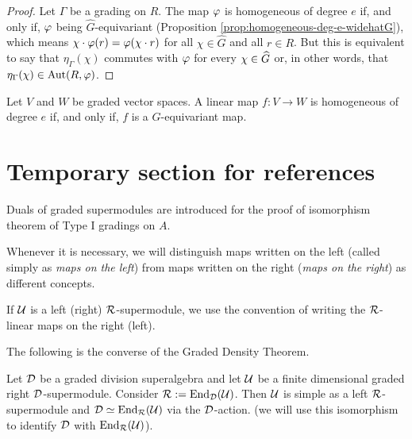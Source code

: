 \begin{proof}
	Let $\Gamma$ be a grading on $R$. The map $\varphi$ is homogeneous of degree $e$ if, and only if, $\varphi$ being $\widehat G$-equivariant (Proposition \ref{prop:homogeneous-deg-e-widehatG}), which means $\chi\cdot \varphi (r) = \varphi (\chi\cdot r)$ for all $\chi \in \widehat G$ and all $r \in R$. But this is equivalent to say that $\eta_\Gamma(\chi)$ commutes with $\varphi$ for every $\chi \in \widehat G$ or, in other words, that $\eta_\Gamma(\chi) \in \operatorname{Aut} (R, \varphi)$.
\end{proof}

\begin{prop}\label{prop:homogeneous-deg-e-widehatG}
	Let $V$ and $W$ be graded vector spaces. A linear map $f: V \to W$ is homogeneous of degree $e$ if, and only if, $f$ is a $\widehat G$-equivariant map.
\end{prop}

\section{Temporary section for references}

Duals of graded supermodules are introduced for the proof of isomorphism theorem of Type I gradings on $A$.

\begin{convention}\label{conv:maps-left-right}
	Whenever it is necessary, we will distinguish maps written on the left (called simply as \emph{maps on the left}) from maps written on the  right (\emph{maps on the right}) as different concepts.

	If $\mathcal U$ is a left (right) $\mathcal R$-supermodule, we use the convention of writing the $\mathcal R$-linear maps on the right (left).
\end{convention}

The following is the converse of the Graded Density Theorem.

\begin{prop}\label{prop:converse-density-thm}
	Let $\mathcal{D}$ be a graded division superalgebra and let $\mathcal U$ be a finite dimensional graded right $\mathcal{D}$-supermodule. Consider $\mathcal R := \operatorname{End}_{\mathcal{D}} (\mathcal U)$. Then $\mathcal U$ is simple as a left $\mathcal R$-supermodule and $\mathcal{D} \simeq \operatorname{End}_{\mathcal R} (\mathcal U)$ via the $\mathcal{D}$-action.
	(we will use this isomorphism to identify $\mathcal{D}$ with $\operatorname{End}_{\mathcal R} (\mathcal U)$).
\end{prop}

